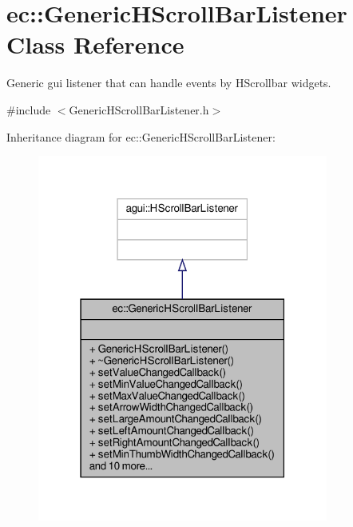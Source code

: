\hypertarget{classec_1_1_generic_h_scroll_bar_listener}{}\section{ec\+:\+:Generic\+H\+Scroll\+Bar\+Listener Class Reference}
\label{classec_1_1_generic_h_scroll_bar_listener}


Generic gui listener that can handle events by H\+Scrollbar widgets.  




{\ttfamily \#include $<$Generic\+H\+Scroll\+Bar\+Listener.\+h$>$}



Inheritance diagram for ec\+:\+:Generic\+H\+Scroll\+Bar\+Listener\+:\nopagebreak
\begin{figure}[H]
\begin{center}
\leavevmode
\includegraphics[width=271pt]{classec_1_1_generic_h_scroll_bar_listener__inherit__graph}
\end{center}
\end{figure}


